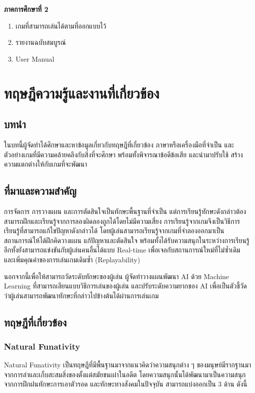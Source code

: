\documentclass[12pt,oneside,openright,a4paper]{cpe-thai-project}
\begin{document}
\textbf{ภาคการศึกษาที่ 2}
\begin{enumerate}
  \item เกมที่สามารถเล่นได้ตามที่ออกแบบไว้
  \item รายงานฉบับสมบูรณ์
  \item User Manual
\end{enumerate}

\chapter{ทฤษฎีความรู้และงานที่เกี่ยวข้อง}

\section{บทนำ}
ในบทนี้ผู้จัดทำได้ศึกษาและหาข้อมูลเกี่ยวกับทฤษฎีที่เกี่ยวข้อง 
ภาษาหรือเครื่องมือที่จำเป็น และตัวอย่างเกมที่มีความคล้ายคลึงกับสิ่งที่จะศึกษา 
พร้อมทั้งพิจารณาข้อดีข้อเสีย และนำมาปรับใช้ สร้างความแตกต่างให้กับเกมที่จะพัฒนา


\section{ที่มาและความสำคัญ}

การจัดการ การวางแผน และการตัดสินใจเป็นทักษะพื้นฐานที่จำเป็น 
แต่การเรียนรู้ทักษะดังกล่าวต้องสามารถฝึกและเรียนรู้จากการลองผิดลองถูกได้โดยไม่มีความเสี่ยง 
การเรียนรู้จากเกมจึงเป็นวิธีการเรียนรู้ที่สามารถแก้ไขปัญหาดังกล่าวได้ 
โดยผู้เล่นสามารถเรียนรู้จากเกมที่จำลองออกมาเป็นสถานการณ์ให้ได้ฝึกคิดวางแผน 
แก้ปัญหาและตัดสินใจ พร้อมทั้งได้รับความสนุกในระหว่างการเรียนรู้ 
อีกทั้งยังสามารถแข่งขันกับผู้เล่นคนอื่นได้แบบ Real-time เพื่อเจอกับสถานการณ์ใหม่ที่ไม่ซ้ำเดิม 
และเพิ่มคุณค่าของการเล่นเกมเดิมซ้ำ (Replayability)

นอกจากนี้เพื่อให้สามารถวัดระดับทักษะของผู้เล่น ผู้จัดทำวางแผนพัฒนา AI ด้วย Machine Learning 
ที่สามารถเลียนแบบวิธีการเล่นของผู้เล่น และปรับระดับความยากของ AI 
เพื่อเป็นตัวชี้วัดว่าผู้เล่นสามารถพัฒนาทักษะที่กล่าวไปข้างต้นได้ผ่านการเล่นเกม


\section{ทฤษฎีที่เกี่ยวข้อง}

\subsection{Natural Funativity}
Natural Funativity เป็นทฤษฎีที่มีพื้นฐานมาจากแนวคิดว่าความสนุกต่าง ๆ 
ของมนุษย์มีรากฐานมาจากการล่าและเก็บสะสมสิ่งของตั้งแต่สมัยชนเผ่าในอดีต 
โดยความสนุกนั้นได้พัฒนามาเป็นความสนุกจากการฝึกฝนทักษะการเอาตัวรอด
และทักษะทางสังคมในปัจจุบัน สามารถแบ่งออกเป็น 3 ด้าน ดังนี้
\end{document}
